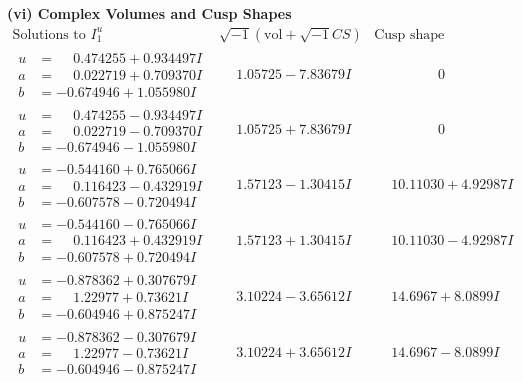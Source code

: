 \documentclass[1p]{elsarticle_modified}
\theoremstyle{definition}
\newcommand{\I}{\sqrt{-1}}
\begin{document}
\newpage\flushleft \textbf{(vi) Complex Volumes and Cusp Shapes}
$$\begin{array}{c|c|c}  
\text{Solutions to }I^u_{1}& \I (\text{vol} + \sqrt{-1}CS) & \text{Cusp shape}\\
 \hline 
\begin{aligned}
u &= \phantom{-}0.474255 + 0.934497 I \\
a &= \phantom{-}0.022719 + 0.709370 I \\
b &= -0.674946 + 1.055980 I\end{aligned}
 & \phantom{-}1.05725 - 7.83679 I & \phantom{-0.000000 } 0 \\ \hline\begin{aligned}
u &= \phantom{-}0.474255 - 0.934497 I \\
a &= \phantom{-}0.022719 - 0.709370 I \\
b &= -0.674946 - 1.055980 I\end{aligned}
 & \phantom{-}1.05725 + 7.83679 I & \phantom{-0.000000 } 0 \\ \hline\begin{aligned}
u &= -0.544160 + 0.765066 I \\
a &= \phantom{-}0.116423 - 0.432919 I \\
b &= -0.607578 - 0.720494 I\end{aligned}
 & \phantom{-}1.57123 - 1.30415 I & \phantom{-}10.11030 + 4.92987 I \\ \hline\begin{aligned}
u &= -0.544160 - 0.765066 I \\
a &= \phantom{-}0.116423 + 0.432919 I \\
b &= -0.607578 + 0.720494 I\end{aligned}
 & \phantom{-}1.57123 + 1.30415 I & \phantom{-}10.11030 - 4.92987 I \\ \hline\begin{aligned}
u &= -0.878362 + 0.307679 I \\
a &= \phantom{-}1.22977 + 0.73621 I \\
b &= -0.604946 + 0.875247 I\end{aligned}
 & \phantom{-}3.10224 - 3.65612 I & \phantom{-}14.6967 + 8.0899 I \\ \hline\begin{aligned}
u &= -0.878362 - 0.307679 I \\
a &= \phantom{-}1.22977 - 0.73621 I \\
b &= -0.604946 - 0.875247 I\end{aligned}
 & \phantom{-}3.10224 + 3.65612 I & \phantom{-}14.6967 - 8.0899 I \\ \hline\begin{aligned}

\end{aligned}
\end{array}$$
\end{document}
